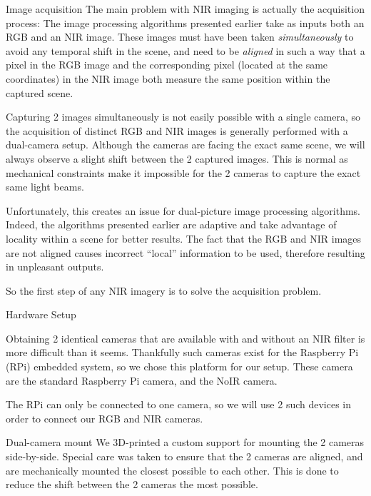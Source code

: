 \documentclass[10pt]{article}
\begin{document}
\begin{section}{Image acquisition}
    The main problem with NIR imaging is actually the acquisition process:
    The image processing algorithms presented earlier take as inputs both an RGB and an NIR image. These images must have been taken \emph{simultaneously} to avoid any temporal shift in the scene, and need to be \emph{aligned} in such a way that a pixel in the RGB image and the corresponding pixel (located at the same coordinates) in the NIR image both measure the same position within the captured scene.

    \medskip

    Capturing 2 images simultaneously is not easily possible with a single camera, so the acquisition of distinct RGB and NIR images is generally performed with a dual-camera setup. Although the cameras are facing the exact same scene, we will always observe a slight shift between the 2 captured images. This is normal as mechanical constraints make it impossible for the 2 cameras to capture the exact same light beams.

    \medskip

    Unfortunately, this creates an issue for dual-picture image processing algorithms. Indeed, the algorithms presented earlier are adaptive and take advantage of locality within a scene for better results. The fact that the RGB and NIR images are not aligned causes incorrect ``local'' information to be used, therefore resulting in unpleasant outputs.

    \medskip

    So the first step of any NIR imagery is to solve the acquisition problem.

    \begin{subsection}{Hardware Setup}
        \label{sec:hardware}

        Obtaining 2 identical cameras that are available with and without an NIR filter is more difficult than it seems. Thankfully such cameras exist for the Raspberry Pi (RPi) embedded system, so we chose this platform for our setup. These camera are the standard Raspberry Pi camera, and the NoIR camera.

        \medskip

        The RPi can only be connected to one camera, so we will use 2 such devices in order to connect our RGB and NIR cameras.

        \begin{subsubsection}{Dual-camera mount}
            We 3D-printed a custom support for mounting the 2 cameras side-by-side. Special care was taken to ensure that the 2 cameras are aligned, and are mechanically mounted the closest possible to each other. This is done to reduce the shift between the 2 cameras the most possible.


\end{subsubsection}
\end{subsection}
\end{section}
\end{document}
